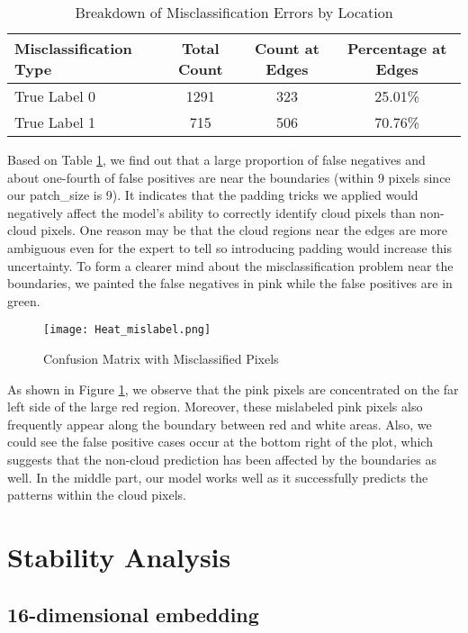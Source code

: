 \documentclass[10pt,letterpaper]{article}
\begin{document}
\begin{table}[h]
    \centering
    \begin{tabular}{lccc}
        \hline
        \textbf{Misclassification Type} & \textbf{Total Count} & \textbf{Count at Edges} & \textbf{Percentage at Edges} \\
        \hline
        True Label 0 & 1291 & 323 & 25.01\% \\
        True Label 1 & 715 & 506 & 70.76\% \\
        \hline
    \end{tabular}
    \caption{Breakdown of Misclassification Errors by Location}
    \label{tab:Misclassification Errors}
\end{table}

Based on Table \ref{tab:Misclassification Errors}, we find out that a large proportion of false negatives and about one-fourth of false positives are near the boundaries (within 9 pixels since our patch\_size is 9). It indicates that the padding tricks we applied would negatively affect the model’s ability to correctly identify cloud pixels than non-cloud pixels. One reason may be that the cloud regions near the edges are more ambiguous even for the expert to tell so introducing padding would increase this uncertainty. To form a clearer mind about the misclassification problem near the boundaries, we painted the false negatives in pink while the false positives are in green.

\begin{figure}[htbp]
    \centering
    \texttt{[image: Heat\_mislabel.png]}
    \caption{Confusion Matrix with Misclassified Pixels}
    \label{fig:Heat_mislabel}
\end{figure}

As shown in Figure \ref{fig:Heat_mislabel}, we observe that the pink pixels are concentrated on the far left side of the large red region. Moreover, these mislabeled pink pixels also frequently appear along the boundary between red and white areas. Also, we could see the false positive cases occur at the bottom right of the plot, which suggests that the non-cloud prediction has been affected by the boundaries as well. In the middle part, our model works well as it successfully predicts the patterns within the cloud pixels.
\section{Stability Analysis}

\subsection{16-dimensional embedding}
\end{document}
